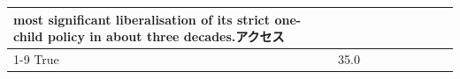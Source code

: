 \begin{table}[H]
\begin{tabular}{lllrlllll}
most significant liberalisation of its strict one-child policy in about three decades.アクセス \\
\cline{1-9}
True & 35.0%
\end{tabular}
\end{table}
